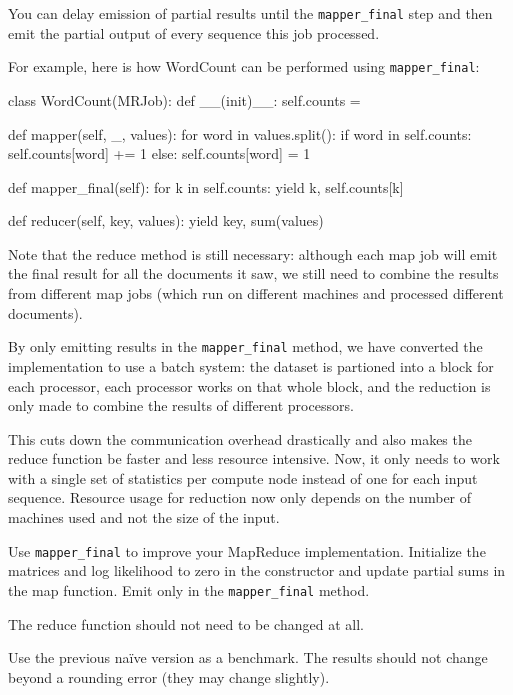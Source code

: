 You can delay emission of partial results until the \verb+mapper_final+ step and
then emit the partial output of every sequence this job processed.

For example, here is how WordCount can be performed using \verb+mapper_final+:

\begin{python}
class WordCount(MRJob):
    def __(init)__:
        self.counts = {}
    
    def mapper(self, _, values):
        for word in values.split():
            if word in self.counts:
                self.counts[word] += 1
            else:
                self.counts[word] = 1

    def mapper_final(self):
        for k in self.counts:
            yield k, self.counts[k]

    def reducer(self, key, values):
        yield key, sum(values)
\end{python}

Note that the reduce method is still necessary: although each map job will emit
the final result for all the documents it saw, we still need to combine the
results from different map jobs (which run on different machines and processed
different documents).

By only emitting results in the \verb+mapper_final+ method, we have converted the
implementation to use a batch system: the dataset is partioned into a block for
each processor, each processor works on that whole block, and the reduction is
only made to combine the results of different processors.

This cuts down the communication overhead drastically and also makes the reduce
function be faster and less resource intensive. Now, it only needs to work with
a single set of statistics per compute node instead of one for each input
sequence. Resource usage for reduction now only depends on the number of
machines used and not the size of the input.

\begin{exercise}
Use \verb+mapper_final+ to improve your MapReduce implementation. Initialize the
matrices and log likelihood to zero in the constructor and update partial sums
in the map function. Emit only in the \verb+mapper_final+ method.

The reduce function should not need to be changed at all.

Use the previous naïve version as a benchmark. The results should not change
beyond a rounding error (they may change slightly).
\end{exercise}

